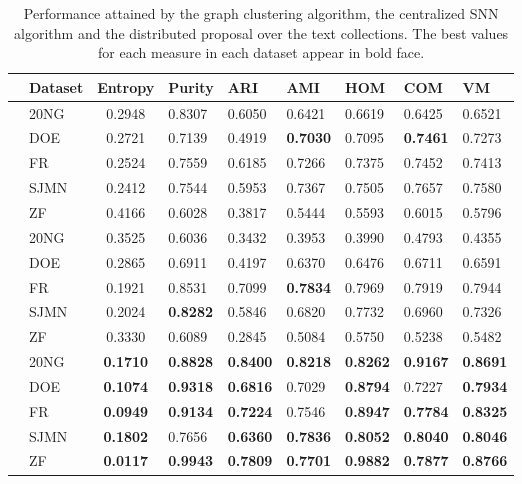 \documentclass[a4paper]{article}
\begin{document}
\begin{table}[!htbp]
\centering
\begin{tabular}{cl|cllllll}
&\textbf{Dataset} & \textbf{Entropy} & \textbf{Purity} & \textbf{ARI} & \textbf{AMI}  & \textbf{HOM} & \textbf{COM} & \textbf{VM} \\ \hline
\parbox[t]{2mm}{} &20NG    & 0.2948 &  0.8307 &  0.6050 &  0.6421 &  0.6619 &  0.6425 &  0.6521  \\
&DOE     & 0.2721 &  0.7139 &  0.4919 &  \textbf{0.7030}  &  0.7095 &  \textbf{0.7461} &  0.7273  \\
&FR        & 0.2524 &  0.7559 &  0.6185 &  0.7266   &  0.7375 &  0.7452 &  0.7413  \\
&SJMN   & 0.2412 &  0.7544 &  0.5953 &  0.7367 &  0.7505 &  0.7657 &  0.7580  \\
&ZF        & 0.4166 &  0.6028 &  0.3817 &  0.5444 &  0.5593 &  0.6015 &  0.5796  \\ \hline
\parbox[t]{2mm}{} &20NG    & 0.3525 & 0.6036 & 0.3432 & 0.3953 & 0.3990 & 0.4793 & 0.4355\\
&DOE     & 0.2865 & 0.6911 & 0.4197 & 0.6370 &  0.6476 & 0.6711 & 0.6591\\
&FR        & 0.1921 & 0.8531 & 0.7099 & \textbf{0.7834} &  0.7969 & 0.7919 & 0.7944\\
&SJMN   & 0.2024 & \textbf{0.8282} & 0.5846 & 0.6820 & 0.7732 & 0.6960 & 0.7326\\
&ZF        & 0.3330 & 0.6089 & 0.2845 & 0.5084 &  0.5750 & 0.5238 & 0.5482\\ \hline
\parbox[t]{2mm}{} &20NG    & \textbf{0.1710} & \textbf{0.8828} & \textbf{0.8400} & \textbf{0.8218} & \textbf{0.8262} & \textbf{0.9167} & \textbf{0.8691}  \\
&DOE     & \textbf{0.1074} & \textbf{0.9318} & \textbf{0.6816} & 0.7029  &  \textbf{0.8794} & 0.7227 & \textbf{0.7934}  \\
&FR        & \textbf{0.0949} & \textbf{0.9134} & \textbf{0.7224} & 0.7546  & \textbf{0.8947} & \textbf{0.7784} & \textbf{0.8325}  \\
&SJMN   & \textbf{0.1802} & 0.7656 & \textbf{0.6360} & \textbf{0.7836}  & \textbf{0.8052} & \textbf{0.8040} & \textbf{0.8046}  \\
&ZF        & \textbf{0.0117} & \textbf{0.9943} & \textbf{0.7809} & \textbf{0.7701}   & \textbf{0.9882} & \textbf{0.7877} & \textbf{0.8766}  \\ \hline
\end{tabular}
\caption{Performance attained by the graph clustering algorithm, the centralized SNN algorithm and the  distributed proposal  over the text collections. The best values for each measure in each dataset appear in bold face.}
\label{table:results}
\end{table}
\end{document}
